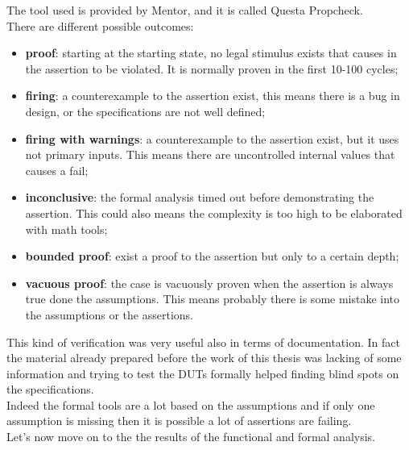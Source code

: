 The tool used is provided by Mentor, and it is called Questa Propcheck.\\
There are different possible outcomes:
\begin{itemize}
    \item \textbf{proof}: starting at the starting state, no legal stimulus exists that causes in the assertion to be violated. It is normally proven in the first 10-100 cycles;
    
    \item \textbf{firing}: a counterexample to the assertion exist, this means there is a bug in design, or the specifications are not well defined;
    
    \item \textbf{firing with warnings}: a counterexample to the assertion exist, but it uses not primary inputs. This means there are uncontrolled internal values that causes a fail;
    
    \item \textbf{inconclusive}: the formal analysis timed out before demonstrating the assertion. This could also means the complexity is too high to be elaborated with math tools; 
    
    \item \textbf{bounded proof}: exist a proof to the assertion but only to a certain depth;
    
    \item \textbf{vacuous proof}: the case is vacuously proven when the assertion is always true done the assumptions. This means probably there is some mistake into the assumptions or the assertions.
\end{itemize}


This kind of verification was very useful also in terms of documentation. In fact the material already prepared before the work of this thesis was lacking of some information and trying to test the DUTs formally helped finding blind spots on the specifications.\\
Indeed the formal tools are a lot based on the assumptions and if only one assumption is missing then it is possible a lot of assertions are failing.\\

Let's now move on to the the results of the functional and formal analysis.
